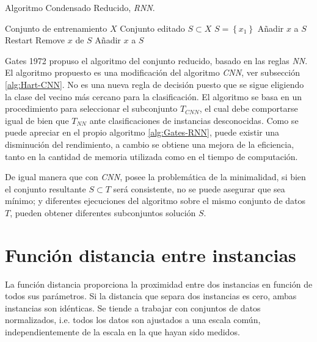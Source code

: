 \begin{algorithm}
\caption{Algoritmo Condensado Reducido, \textit{RNN}.}\label{alg:Gates-RNN}
\begin{algorithmic}[1]
\Require Conjunto de entrenamiento $X$
\Ensure Conjunto editado $S \subset X$
\Statex
{}
	\State $S = \left\lbrace x_1 \right\rbrace$
			\State Añadir $x$ a $S$
			\State Restart 
		\EndIf
	\EndFor
		\State Remove $x$ de $S$
			\State Añadir $x$ a $S$
		\EndIf
	\EndFor
\EndProcedure
\end{algorithmic}
\end{algorithm}

Gates \cite{gates1972reduced} 1972 propuso el algoritmo del conjunto reducido, basado en las reglas \textit{NN}. El algoritmo propuesto es una modificación del algoritmo \textit{CNN}, ver subsección \ref{alg:Hart-CNN}. No es una nueva regla de decisión puesto que se sigue eligiendo la clase del vecino más cercano para la clasificación. 
El algoritmo se basa en un procedimiento para seleccionar el subconjunto $T_{CNN}$, el cual debe comportarse igual de bien que $T_{NN}$ ante clasificaciones de instancias desconocidas. Como se puede apreciar en el propio algoritmo \ref{alg:Gates-RNN}, puede existir una disminución del rendimiento, a cambio se obtiene una mejora de la eficiencia, tanto en la cantidad de memoria utilizada como en el tiempo de computación.

De igual manera que con \textit{CNN}, posee la problemática de la minimalidad, si bien el conjunto resultante $S \subset T$ será consistente, no se puede asegurar que sea mínimo; y diferentes ejecuciones del algoritmo sobre el mismo conjunto de datos $T$, pueden obtener diferentes subconjuntos solución $S$.

\newpage
\section{Función distancia entre instancias}
La función distancia proporciona la proximidad entre dos instancias en función de todos sus parámetros. Si la distancia que separa dos instancias es cero, ambas instancias son idénticas. Se tiende a trabajar con conjuntos de datos normalizados, i.e. todos los datos son ajustados a una escala común, independientemente de la escala en la que hayan sido medidos.

